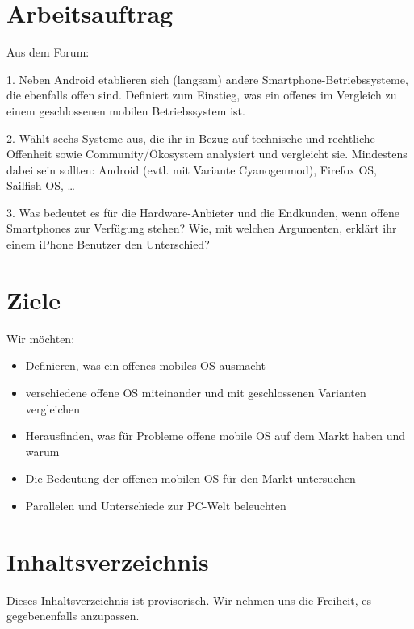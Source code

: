 \documentclass{article}
\begin{document}
\section{Arbeitsauftrag}

Aus dem Forum:

1. Neben Android etablieren sich (langsam) andere Smartphone-Betriebssysteme, die ebenfalls offen sind. Definiert zum Einstieg, was ein offenes im Vergleich zu einem geschlossenen mobilen Betriebssystem ist.

2. Wählt sechs Systeme aus, die ihr in Bezug auf technische und rechtliche Offenheit sowie Community/Ökosystem analysiert und vergleicht sie. Mindestens dabei sein sollten: Android (evtl. mit Variante Cyanogenmod), Firefox OS, Sailfish OS, …

3. Was bedeutet es für die Hardware-Anbieter und die Endkunden, wenn offene Smartphones zur Verfügung stehen? Wie, mit welchen Argumenten, erklärt ihr einem iPhone Benutzer den Unterschied?

\section{Ziele}

Wir m\"{o}chten:

\begin{itemize}
    \item Definieren, was ein offenes mobiles OS ausmacht
    \item verschiedene offene OS miteinander und mit geschlossenen Varianten vergleichen
    \item Herausfinden, was f\"{u}r Probleme offene mobile OS auf dem Markt haben und warum
    \item Die Bedeutung der offenen mobilen OS f\"{u}r den Markt untersuchen
    \item Parallelen und Unterschiede zur PC-Welt beleuchten
\end{itemize}

\section{Inhaltsverzeichnis}

Dieses Inhaltsverzeichnis ist provisorisch. Wir nehmen uns die Freiheit, es gegebenenfalls anzupassen.
\end{document}
